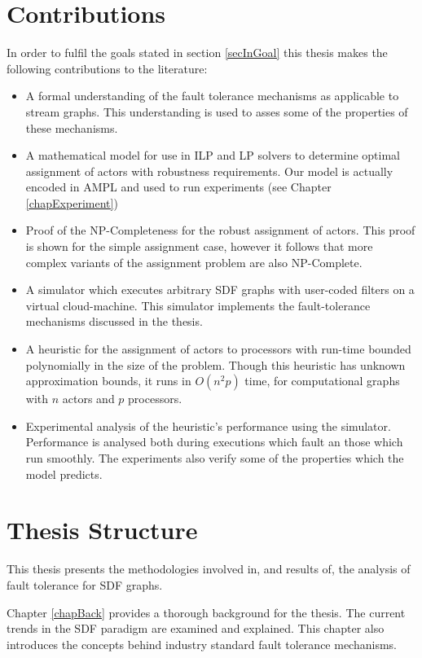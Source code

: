 \section{Contributions}

In order to fulfil the goals stated in section \ref{secInGoal} this thesis makes the following contributions to the literature:

\begin{itemize}
	\item A formal understanding of the fault tolerance mechanisms as applicable to stream graphs.
			This understanding is used to asses some of the properties of these mechanisms.
	\item A mathematical model for use in ILP and LP solvers to determine optimal assignment of actors with robustness requirements.
			Our model is actually encoded in AMPL and used to run experiments (see Chapter \ref{chapExperiment})
	\item Proof of the NP-Completeness for the robust assignment of actors.
			This proof is shown for the simple assignment case, however it follows that more complex variants of the assignment problem are also NP-Complete.
	\item A simulator which executes arbitrary SDF graphs with user-coded filters on a virtual cloud-machine.
			This simulator implements the fault-tolerance mechanisms discussed in the thesis.
	\item A heuristic for the assignment of actors to processors with run-time bounded polynomially in the size of the problem.
			Though this heuristic has unknown approximation bounds, it runs in $O(n^2 p)$ time, for computational graphs with $n$ actors and $p$ processors.
	\item Experimental analysis of the heuristic's performance using the simulator.
			Performance is analysed both during executions which fault an those which run smoothly.
			The experiments also verify some of the properties which the model predicts.
\end{itemize}

\section{Thesis Structure}

This thesis presents the methodologies involved in, and results of, the analysis of fault tolerance for SDF graphs.

Chapter \ref{chapBack} provides a thorough background for the thesis.
The current trends in the SDF paradigm are examined and explained.
This chapter also introduces the concepts behind industry standard fault tolerance mechanisms.

